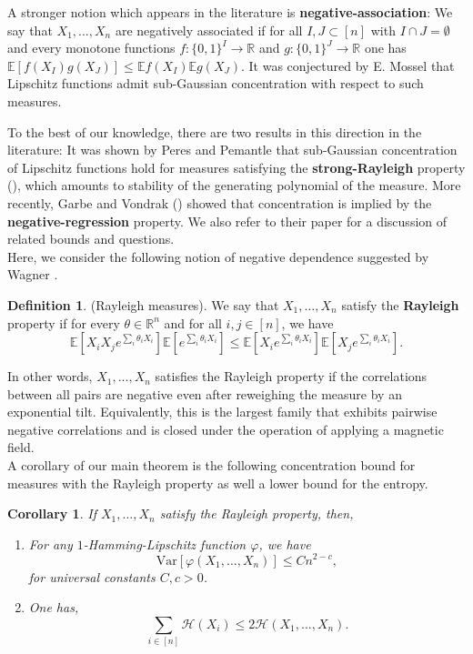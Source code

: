 \documentclass[12pt]{article}
\def \RR {\mathbb R}
\def \EE {\mathbb E}
\def \Var {\mathrm{Var}}
\newtheorem{corollary}[theorem]{Corollary}
\theoremstyle{definition}
\newtheorem{definition}[theorem]{Definition}
\theoremstyle{remark}
\begin{document}
A stronger notion which appears in the literature is \textbf{negative-association}: We say that $X_1,...,X_n$ are negatively associated if for all $I,J \subset [n]$ with $I \cap J = \emptyset$ and every monotone functions $f:\{0,1\}^I \to \RR$ and $g:\{0,1\}^J \to \RR$ one has $\EE [f(X_I) g(X_J)] \leq \EE f(X_I) \EE g(X_J)$. It was conjectured by E. Mossel that Lipschitz functions admit sub-Gaussian concentration with respect to such measures. 

To the best of our knowledge, there are two results in this direction in the literature: It was shown by Peres and Pemantle that sub-Gaussian concentration of Lipschitz functions hold for measures satisfying the \textbf{strong-Rayleigh} property (\cite{Peres-Pemantle}), which amounts to stability of the generating polynomial of the measure. More recently, Garbe and Vondrak (\cite{Garbe-Vondrak}) showed that concentration is implied by the \textbf{negative-regression} property. We also refer to their paper for a discussion of related bounds and questions. \\

Here, we consider the following notion of negative dependence suggested by Wagner \cite{Wa08}.
\begin{definition} (Rayleigh measures). 
We say that $X_1,\dots,X_n$ satisfy the \textbf{Rayleigh} property if for every $\theta \in \RR^n$ and for all $i,j \in [n]$, we have
\begin{equation}\label{eq:TNC}
\EE \left [X_i X_j e^{ \sum_i \theta_i X_i} \right ] \EE \left [ e^{ \sum_i \theta_i X_i} \right ] \leq \EE\left [X_i e^{ \sum_i \theta_i X_i} \right ] \EE\left [ X_j e^{ \sum_i \theta_i X_i} \right ]. 
\end{equation}
\end{definition} 

In other words, $X_1,...,X_n$ satisfies the Rayleigh property if the correlations between all pairs are negative even after reweighing the measure by an exponential tilt. Equivalently, this is the largest family that exhibits pairwise negative correlations and is closed under the operation of applying a magnetic field.\\

A corollary of our main theorem is the following concentration bound for measures with the Rayleigh property as well a lower bound for the entropy.
\begin{corollary} \label{cor:TNC}
If $X_1,...,X_n$ satisfy the Rayleigh property, then,
\begin{enumerate}
\item 
For any $1$-Hamming-Lipschitz function $\varphi$, we have 
$$
\Var[\varphi(X_1,\dots,X_n)] \leq C n^{2-c},
$$ 
for universal constants $C,c>0$.
\item 
One has,
$$
\sum_{i \in [n]} \mathcal{H}(X_i) \leq 2 \mathcal{H}(X_1,...,X_n).
$$	
\end{enumerate}
\end{corollary} 
\end{document}
